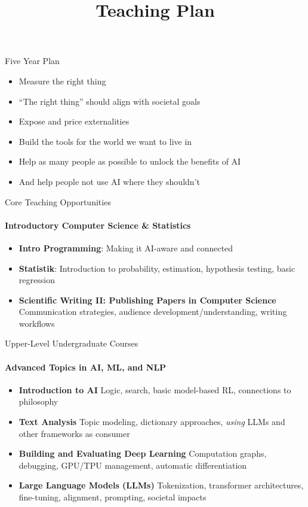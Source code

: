 \documentclass[compress]{beamer}
\begin{document}
\begin{frame}{Five Year Plan}
\begin{itemize}
	\item Measure the right thing
	\item ``The right thing'' should align with societal goals
	\item Expose and price externalities
	\item Build the tools for the world we want to live in
	\item \alert<2>{Help as many people as possible to unlock the benefits of AI}
	\item \alert<2>{And help people not use AI where they shouldn't}
\end{itemize}

\end{frame}

\title[]{Teaching Plan}


\frame{
\titlepage
\tiny
}


\begin{frame}{Core Teaching Opportunities}
\framesubtitle{Introductory Computer Science \& Statistics}
\begin{itemize}
  \item \textbf{Intro Programming}: Making it AI-aware and connected
  \item \textbf{Statistik}:  
        Introduction to probability, estimation, hypothesis testing, basic regression
   \item \textbf{Scientific Writing II: Publishing Papers in Computer Science}
        Communication strategies, audience development/understanding, writing workflows
\end{itemize}
\end{frame}

\begin{frame}{Upper-Level Undergraduate Courses}
\framesubtitle{Advanced Topics in AI, ML, and NLP}
\begin{itemize}
  \item \textbf{Introduction to AI}  
        Logic, search, basic model-based RL, connections to philosophy

  \item \textbf{Text Analysis}  
        Topic modeling, dictionary approaches, \emph{using} LLMs and other frameworks as consumer

  \item \textbf{Building and Evaluating Deep Learning}  
Computation graphs, debugging, GPU/TPU management, automatic differentiation 


  \item \textbf{Large Language Models (LLMs)}  
        Tokenization, transformer architectures, fine-tuning, alignment, prompting, societal impacts
\end{itemize}
\end{frame}
\end{document}
